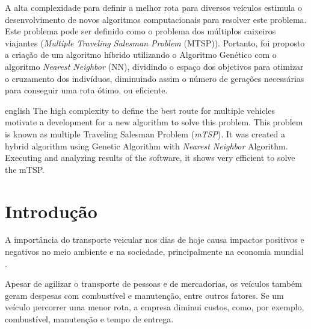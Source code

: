 \documentclass[12pt,openright,a4paper,oneside]{tcc}
\begin{document}

	\imprimircapa
	\imprimirfolhaderosto
	\folhadeaprovacaoteste
	\tableofcontents
	\newpage

	\begin{resumo}
		A alta complexidade para definir a melhor rota para diversos veículos estimula o desenvolvimento de novos algoritmos computacionais para resolver este problema. Este problema pode ser definido como o problema dos múltiplos caixeiros viajantes (\textit{Multiple Traveling Salesman Problem} (MTSP)). Portanto, foi proposto a criação de um algoritmo híbrido utilizando o Algoritmo Genético com o algoritmo \textit{Nearest Neighbor} (NN), dividindo o espaço dos objetivos para otimizar o cruzamento dos indivíduos, diminuindo assim o número de gerações necessárias para conseguir uma rota ótimo, ou eficiente.

	\end{resumo}

	\begin{resumo}[Abstract]
    	\begin{otherlanguage*}{english}
		The high complexity to define the best route for multiple vehicles motivate a development for a new algorithm to solve this problem. This problem is known as multiple Traveling Salesman Problem (\textit{mTSP}). It was created a hybrid algorithm using Genetic Algorithm with \textit{Nearest Neighbor} Algorithm. Executing and analyzing results of the software, it shows very efficient to solve the mTSP.  
		\end{otherlanguage*}
	\end{resumo}
	

	\chapter{Introdução}
		
		A importância do transporte veicular nos dias de hoje causa impactos positivos e negativos 
	    no meio ambiente e na sociedade, principalmente na economia mundial \cite{meioAmbiente}. 
		
		Apesar de agilizar o transporte de pessoas e  de mercadorias, 
		os veículos também geram despesas com combustível e manutenção, entre outros fatores. 
		Se um veículo percorrer uma menor rota, a empresa diminui custos, como, por exemplo, 
		combustível, manutenção e tempo de entrega.
\end{document}

